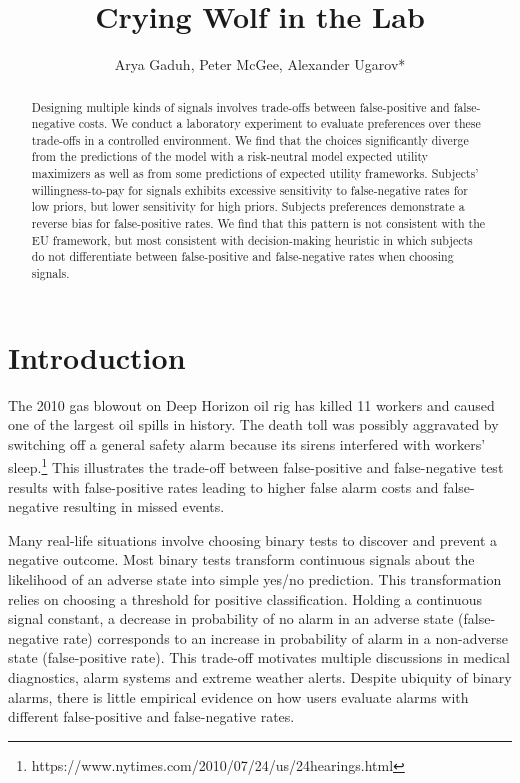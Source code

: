 \documentclass[12pt,a4paper]{article}
\title{\Large Crying Wolf in the Lab\\}
\author{\large Arya Gaduh, Peter McGee, Alexander Ugarov*}
\begin{document}
\maketitle
\onehalfspacing
\begin{abstract}{Designing multiple kinds of signals involves trade-offs between false-positive and false-negative costs. We conduct a laboratory experiment to evaluate preferences over these trade-offs in a controlled environment. We find that the choices significantly diverge from the predictions of the model with a risk-neutral model expected utility maximizers as well as from some predictions of expected utility frameworks. Subjects' willingness-to-pay for signals exhibits excessive sensitivity to false-negative rates  for low priors, but lower sensitivity for high priors. Subjects preferences demonstrate a reverse bias for false-positive rates. We find that this pattern is not consistent with the EU framework, but most consistent with decision-making heuristic in which subjects do not differentiate between false-positive and false-negative rates when choosing signals.}


\vspace{10pt}
\begin{singlespace}

\end{singlespace}
\end{abstract}

\vspace{180pt}
\newpage
\normalsize

\section{Introduction}

The 2010 gas blowout on Deep Horizon oil rig has killed 11 workers and caused one of the largest oil spills in history. The death toll was possibly aggravated by switching off a general safety alarm because its sirens interfered with workers' sleep.\footnote{https://www.nytimes.com/2010/07/24/us/24hearings.html} This illustrates the trade-off between false-positive and false-negative test results with false-positive rates leading to higher false alarm costs and false-negative resulting in missed events. 

Many real-life situations involve choosing binary tests to discover and prevent a negative outcome. Most binary tests transform continuous signals about the likelihood of an adverse state into simple yes/no prediction. This transformation relies on choosing a threshold for positive classification. Holding a continuous signal constant, a decrease in probability of no alarm in an adverse state (false-negative rate) corresponds to an increase in probability of alarm in a non-adverse state (false-positive rate). This trade-off motivates multiple discussions in medical diagnostics, alarm systems and extreme weather alerts. Despite ubiquity of binary alarms, there is little empirical evidence on how users evaluate alarms with different false-positive and false-negative rates. 
\end{document}
